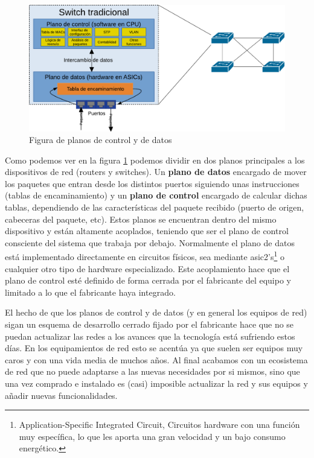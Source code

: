 \begin{figure}[h!]
    \centering
    \includegraphics[width=\textwidth]{imagenes/figuras/Switch tradicional.pdf}
    \caption{Figura de planos de control y de datos}
    \label{fig:planos_red_tradicional}
\end{figure}



Como podemos ver en la figura \ref{fig:planos_red_tradicional} podemos dividir en dos planos principales a los dispositivos de red (routers y switches). Un \textbf{plano de datos} encargado de mover los paquetes que entran desde los distintos puertos siguiendo unas instrucciones (tablas de encaminamiento) y un \textbf{plano de control} encargado de calcular dichas tablas, dependiendo de las características del paquete recibido (puerto de origen, cabeceras del paquete, etc). Estos planos se encuentran dentro del mismo dispositivo y están altamente acoplados, teniendo que ser el plano de control consciente del sistema que trabaja por debajo. Normalmente el plano de datos está implementado directamente en circuitos físicos, sea mediante \acrshort{asic2}'s\footnote{Application-Specific Integrated Circuit, Circuitos hardware con una función muy específica, lo que les aporta una gran velocidad y un bajo consumo energético.} o cualquier otro tipo de hardware especializado. Este acoplamiento hace que el plano de control esté definido de forma cerrada por el fabricante del equipo y limitado a lo que el fabricante haya integrado.


El hecho de que los planos de control y de datos (y en general los equipos de red) sigan un esquema de desarrollo cerrado fijado por el fabricante hace que no se puedan actualizar las redes a los avances que la tecnología está sufriendo estos días. En los equipamientos de red esto se acentúa ya que suelen ser equipos muy caros y con una vida media de muchos años. Al final acabamos con un ecosistema de red que no puede adaptarse a las nuevas necesidades por si mismos, sino que una vez comprado e instalado es (casi) imposible actualizar la red y sus equipos y añadir nuevas funcionalidades.


